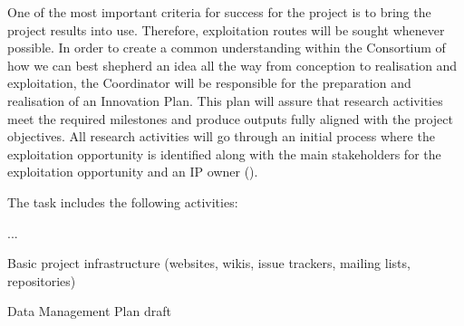 \begin{workpackage}[id=management,type=MGT,wphases=0-36!.44,
  title=Project Management,
  short=Management,
  lead=SRL,
  MPRM=1,
  QSRM=1,
  IFRRM=1,
  UIORM=1,
  SRLRM=12,
  swsites
]
\begin{tasklist}
\begin{task}[
  title=Innovation Management,
  id=innovation-management,
  lead=SRL,
  PM=6,
  wphases={0-36!.2},
  partners={MP,QS,UIO,IFR}
]
One of the most important criteria for success for the \TheProject project is to
bring the project results into use. Therefore, exploitation routes will be
sought whenever possible. In order to create a common understanding within the
Consortium of how we can best shepherd an idea all the way from conception to
realisation and exploitation, the Coordinator will be responsible for the
preparation and realisation of an Innovation Plan. This plan will assure that
research activities meet the required milestones and produce outputs fully
aligned with the project objectives. All research activities will go through an
initial process where the exploitation opportunity is identified along with the
main stakeholders for the exploitation opportunity and an IP owner
().
\end{task}

\begin{task}[
  title=Community Engagement Panel,
  id=communikty-panel,
  lead=SRL,
  PM=24,
  wphases={0-36!.5},
  partners={MP,QS,UIO,IFR},
]
The task includes the following activities:
\begin{compactenum}
\item {} ...
\end{compactenum}
\end{task}

\end{tasklist}


\begin{wpdelivs}


\begin{wpdeliv}[due=1,miles=startup,id=infrastructure,dissem=PU,nature=DEC,lead=SRL]
  {Basic project infrastructure (websites, wikis, issue trackers, mailing lists, repositories)}
\end{wpdeliv}

\begin{wpdeliv}[due=9,miles=startup,id=data-management-plan-draft,dissem=PU,nature=R,lead=SRL]
  {Data Management Plan draft}
\end{wpdeliv}


\end{wpdelivs}
\end{workpackage}
